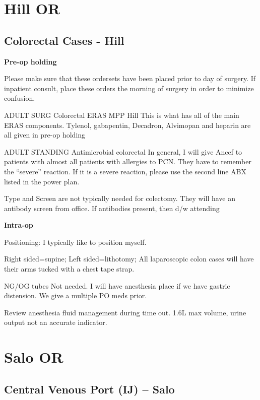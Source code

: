 \documentclass[
]{book}
\begin{document}
\hypertarget{part-hill-or}{%
\part*{Hill OR}\label{part-hill-or}}

\hypertarget{colorectal-cases---hill}{%
\chapter{Colorectal Cases - Hill}\label{colorectal-cases---hill}}

\textbf{Pre-op holding}

Please make sure that these ordersets have been placed prior to day of surgery. If inpatient consult, place these orders the morning of surgery in order to minimize confusion.

ADULT SURG Colorectal ERAS MPP Hill This is what has all of the main ERAS components. Tylenol, gabapentin, Decadron, Alvimopan and heparin are all given in pre-op holding

ADULT STANDING Antimicrobial colorectal In general, I will give Ancef to patients with almost all patients with allergies to PCN. They have to remember the ``severe'' reaction. If it is a severe reaction, please use the second line ABX listed in the power plan.

Type and Screen are not typically needed for colectomy. They will have an antibody screen from office. If antibodies present, then d/w attending

\textbf{Intra-op}

Positioning: I typically like to position myself.

Right sided=supine; Left sided=lithotomy; All laparoscopic colon cases will have their arms tucked with a chest tape strap.

NG/OG tubes Not needed. I will have anesthesia place if we have gastric distension. We give a multiple PO meds prior.

Review anesthesia fluid management during time out. 1.6L max volume, urine output not an accurate indicator.

\hypertarget{part-salo-or}{%
\part*{Salo OR}\label{part-salo-or}}

\hypertarget{cv_port_salo}{%
\chapter{Central Venous Port (IJ) -- Salo}\label{cv_port_salo}}
\end{document}
